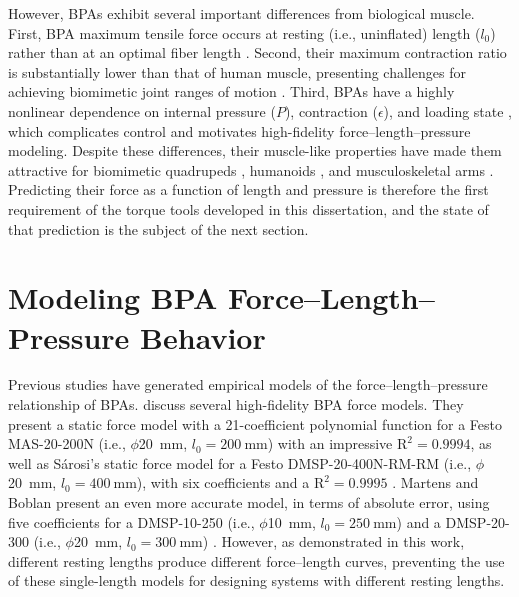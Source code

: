 However, BPAs exhibit several important differences from biological muscle. First, BPA maximum tensile force occurs at resting (i.e., uninflated) length ($l_0$) rather than at an optimal fiber length \citep{liang_comparative_2020}. Second, their maximum contraction ratio is substantially lower than that of human muscle, presenting challenges for achieving biomimetic joint ranges of motion \citep{hunt_modeling_2017, sarosi_comparative_2017, liang_comparative_2020}. Third, BPAs have a highly nonlinear dependence on internal pressure ($P$), contraction ($\epsilon$), and loading state \citep{hunt_modeling_2017, martens_modeling_2017}, which complicates control and motivates high-fidelity force--length--pressure modeling. Despite these differences, their muscle-like properties have made them attractive for biomimetic quadrupeds \citep{aschenbeck_design_2006, scharzenberger_design_2019}, humanoids \citep{asano_design_2017, hitzmann_anthropomorphic_2018}, and musculoskeletal arms \citep{kurumaya_musculoskeletal_2016, chen_realizing_2019}. Predicting their force as a function of length and pressure is therefore the first requirement of the torque tools developed in this dissertation, and the state of that prediction is the subject of the next section.

\section{Modeling BPA Force--Length--Pressure Behavior}\label{sec:bg_bpamodels}

Previous studies have generated empirical models of the force--length--pressure relationship of BPAs. \citet{sarosi_comparative_2017} discuss several high-fidelity BPA force models. They present a static force model with a 21-coefficient polynomial function for a Festo MAS-20-200N (i.e., $\phi$\qty{20}{\mm}, $l_0=\qty{200}{\mm}$) with an impressive $\text{R}^2=0.9994$, as well as S\'arosi's static force model for a Festo DMSP-20-400N-RM-RM (i.e., $\phi$\qty{20}{\mm}, $l_0=\qty{400}{\mm}$), with six coefficients and a $\text{R}^2=0.9995$ \citep{sarosi_new_2012, sarosi_investigation_2013}. Martens and Boblan present an even more accurate model, in terms of absolute error, using five coefficients for a DMSP-10-250 (i.e., $\phi$\qty{10}{\mm}, $l_0=\qty{250}{\mm}$) and a DMSP-20-300 (i.e., $\phi$\qty{20}{\mm}, $l_0=\qty{300}{\mm}$) \citep{martens_modeling_2017}. However, as demonstrated in this work, different resting lengths produce different force--length curves, preventing the use of these single-length models for designing systems with different resting lengths.

